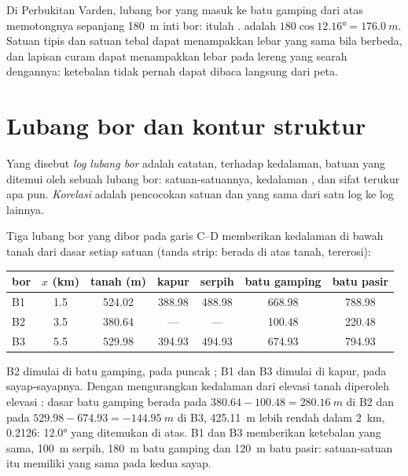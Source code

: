 Di Perbukitan Varden, lubang bor yang masuk ke batu gamping dari atas memotongnya sepanjang \qty{180}{m} inti bor: itulah .  adalah $180\cos\ang{12.16} = \qty{176.0}{m}$. Satuan tipis dan satuan tebal dapat menampakkan lebar  yang sama bila  berbeda, dan lapisan curam dapat menampakkan  lebar pada lereng yang searah dengannya: ketebalan tidak pernah dapat dibaca langsung dari peta.

\section{Lubang bor dan kontur struktur}\label{sec:b1:cross-sections:boreholes}

\begin{definition}\label{def:b1:cross-sections:log}
Yang disebut \emph{log lubang bor} adalah catatan, terhadap kedalaman, batuan yang ditemui oleh sebuah lubang bor: satuan-satuannya, kedalaman , dan sifat terukur apa pun. \emph{Korelasi} adalah pencocokan satuan dan  yang sama dari satu log ke log lainnya.
\end{definition}

Tiga lubang bor yang dibor pada garis C--D memberikan kedalaman di bawah tanah dari dasar setiap satuan (tanda strip:  berada di atas tanah, tererosi):
\begin{center}
\small
\begin{tabular}{lcccccc}
\hline
bor & $x$ (km) & tanah (m) & kapur & serpih & batu gamping & batu pasir \\
\hline
B1 & 1.5 & 524.02 & 388.98 & 488.98 & 668.98 & 788.98 \\
B2 & 3.5 & 380.64 & --- & --- & 100.48 & 220.48 \\
B3 & 5.5 & 529.98 & 394.93 & 494.93 & 674.93 & 794.93 \\
\hline
\end{tabular}
\end{center}
B2 dimulai di batu gamping, pada puncak ; B1 dan B3 dimulai di kapur, pada sayap-sayapnya. Dengan mengurangkan kedalaman dari elevasi tanah diperoleh elevasi : dasar batu gamping berada pada $380.64 - 100.48 = \qty{280.16}{m}$ di B2 dan pada $529.98 - 674.93 =
\qty{-144.95}{m}$ di B3, \qty{425.11}{m} lebih rendah dalam \qty{2}{km}, 
\num{0.2126}:  \ang{12.0} yang ditemukan di atas. B1 dan B3 memberikan ketebalan yang sama, \qty{100}{m} serpih, \qty{180}{m} batu gamping dan \qty{120}{m} batu pasir: satuan-satuan itu memiliki  yang sama pada kedua sayap.

